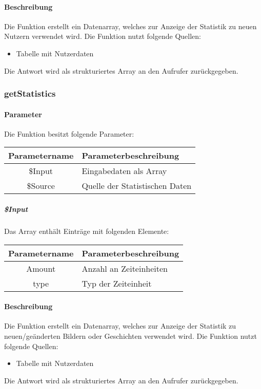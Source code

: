 \paragraph{Beschreibung} Die Funktion erstellt ein Datenarray, welches zur Anzeige der Statistik zu neuen Nutzern verwendet wird. Die Funktion nutzt folgende Quellen:
\begin{itemize}
	\item Tabelle mit Nutzerdaten
\end{itemize}
Die Antwort wird als strukturiertes Array an den Aufrufer zurückgegeben.
\subsubsection{getStatistics}
\paragraph{Parameter} Die Funktion besitzt folgende Parameter:
\begin{table}[H]
	\begin{tabular}{|c|p{11cm}|}
		\hline
		\textbf{Parametername} & \textbf{Parameterbeschreibung} \\ \hline
		\$Input  & Eingabedaten als Array \\ \hline
		\$Source & Quelle der Statistischen Daten \\ \hline
	\end{tabular}
\end{table}
\subparagraph{\$Input}Das Array enthält Einträge mit folgenden Elemente:
\begin{table}[H]
	\begin{tabular}{|c|p{11cm}|}
		\hline
		\textbf{Parametername} & \textbf{Parameterbeschreibung} \\ \hline
		Amount & Anzahl an Zeiteinheiten \\ \hline
		type   & Typ der Zeiteinheit \\ \hline
	\end{tabular}
\end{table}
\paragraph{Beschreibung} Die Funktion erstellt ein Datenarray, welches zur Anzeige der Statistik zu neuen/geänderten Bildern oder Geschichten verwendet wird. Die Funktion nutzt folgende Quellen:
\begin{itemize}
	\item Tabelle mit Nutzerdaten
\end{itemize}
Die Antwort wird als strukturiertes Array an den Aufrufer zurückgegeben.

